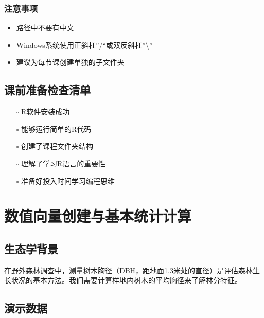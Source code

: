\documentclass[
]{book}
\providecommand{\tightlist}{%
  \setlength{\itemsep}{0pt}\setlength{\parskip}{0pt}}
\begin{document}
\hypertarget{ux6ce8ux610fux4e8bux9879}{%
\subsubsection{注意事项}\label{ux6ce8ux610fux4e8bux9879}}

\begin{itemize}
\tightlist
\item
  路径中不要有中文
\item
  Windows系统使用正斜杠''/``或双反斜杠''\textbackslash''
\item
  建议为每节课创建单独的子文件夹
\end{itemize}

\hypertarget{ux8bfeux524dux51c6ux5907ux68c0ux67e5ux6e05ux5355}{%
\subsection{课前准备检查清单}\label{ux8bfeux524dux51c6ux5907ux68c0ux67e5ux6e05ux5355}}

\begin{itemize}
\tightlist
\item[$\square$]
  R软件安装成功
\item[$\square$]
  能够运行简单的R代码
\item[$\square$]
  创建了课程文件夹结构
\item[$\square$]
  理解了学习R语言的重要性
\item[$\square$]
  准备好投入时间学习编程思维
\end{itemize}

\hypertarget{ux6570ux503cux5411ux91cfux521bux5efaux4e0eux57faux672cux7edfux8ba1ux8ba1ux7b97}{%
\section{数值向量创建与基本统计计算}\label{ux6570ux503cux5411ux91cfux521bux5efaux4e0eux57faux672cux7edfux8ba1ux8ba1ux7b97}}

\hypertarget{ux751fux6001ux5b66ux80ccux666f}{%
\subsection{生态学背景}\label{ux751fux6001ux5b66ux80ccux666f}}

在野外森林调查中，测量树木胸径（DBH，距地面1.3米处的直径）是评估森林生长状况的基本方法。我们需要计算样地内树木的平均胸径来了解林分特征。

\hypertarget{ux6f14ux793aux6570ux636e}{%
\subsection{演示数据}\label{ux6f14ux793aux6570ux636e}}
\end{document}
